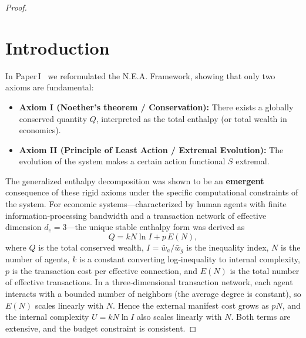 \documentclass{article}
\begin{document}
\begin{proof}
\section{Introduction}
In Paper I~\cite{paperI} we reformulated the N.E.A. Framework, showing that only two axioms are fundamental:
\begin{itemize}
    \item \textbf{Axiom I (Noether’s theorem / Conservation):} There exists a globally conserved quantity $Q$, interpreted as the total enthalpy (or total wealth in economics).
    \item \textbf{Axiom II (Principle of Least Action / Extremal Evolution):} The evolution of the system makes a certain action functional $S$ extremal.
\end{itemize}
The generalized enthalpy decomposition was shown to be an \textbf{emergent} consequence of these rigid axioms under the specific computational constraints of the system. For economic systems—characterized by human agents with finite information‑processing bandwidth and a transaction network of effective dimension $d_e = 3$—the unique stable enthalpy form was derived as
\[
Q = k N \ln I + p\,E(N),
\]
where $Q$ is the total conserved wealth, $I = \bar{w}_a / \bar{w}_g$ is the inequality index, $N$ is the number of agents, $k$ is a constant converting log‑inequality to internal complexity, $p$ is the transaction cost per effective connection, and $E(N)$ is the total number of effective transactions. In a three‑dimensional transaction network, each agent interacts with a bounded number of neighbors (the average degree is constant), so $E(N)$ scales linearly with $N$. Hence the external manifest cost grows as $pN$, and the internal complexity $U = k N \ln I$ also scales linearly with $N$. Both terms are extensive, and the budget constraint is consistent.


\end{proof}
\end{document}
